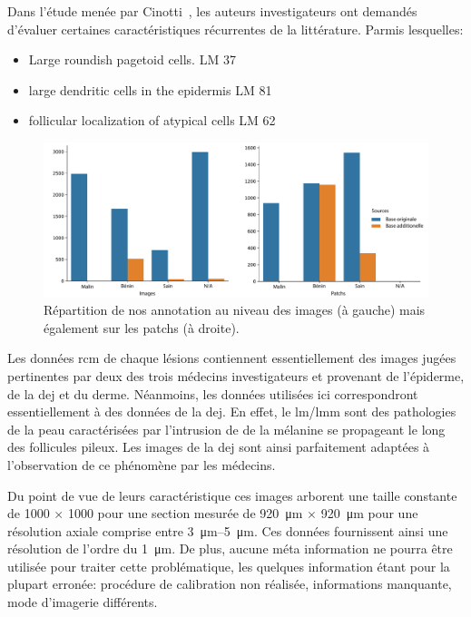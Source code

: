 Dans l'étude menée par Cinotti~\cite{Cinotti2018}, les auteurs investigateurs ont demandés d'évaluer certaines caractéristiques récurrentes de la littérature. Parmis lesquelles:
\begin{itemize}
    \item Large roundish pagetoid cells. LM 37%
    \item large dendritic cells in the epidermis LM 81%
    \item follicular localization of atypical cells LM 62%
\end{itemize}\par

\begin{figure}[H]
    \begin{center}
        \includegraphics[width=\linewidth]{contents/x_microscopy/resources/scheme_rcm_statistics.pdf}
        \caption{Répartition de nos annotation au niveau des images (à gauche) mais également sur les patchs (à droite).}
        \label{fig:scheme_rcm_statistics}
    \end{center} 
\end{figure}\par

Les données \gls{rcm} de chaque lésions contiennent essentiellement des images jugées pertinentes par deux des trois médecins investigateurs et provenant de l'épiderme, de la \gls{dej} et du derme. Néanmoins, les données utilisées ici correspondront essentiellement à des données de la \gls{dej}. En effet, le \gls{lm}/\gls{lmm} sont des pathologies de la peau caractérisées par l'intrusion de de la mélanine se propageant le long des follicules pileux. Les images de la \gls{dej} sont ainsi parfaitement adaptées à l'observation de ce phénomène par les médecins. \par

Du point de vue de leurs caractéristique ces images arborent une taille constante de \SI{1000}{\px} $\times$ \SI{1000}{\px} pour une section mesurée de \SI{920}{\micro\metre} $\times$ \SI{920}{\micro\metre} pour une résolution axiale comprise entre \SIrange{3}{5}{\micro\metre}. Ces données fournissent ainsi une résolution de l'ordre du \SI{1}{\micro\metre}. De plus, aucune méta information ne pourra être utilisée pour traiter cette problématique, les quelques information étant pour la plupart erronée: procédure de calibration non réalisée, informations manquante, mode d'imagerie différents.\par

